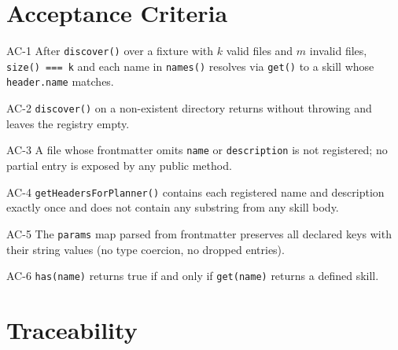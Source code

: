 \section{Acceptance Criteria}

\begin{ac}{AC-1}
After \texttt{discover()} over a fixture with $k$ valid files and $m$ invalid files, \texttt{size() === k} and each name in \texttt{names()} resolves via \texttt{get()} to a skill whose \texttt{header.name} matches.
\end{ac}

\begin{ac}{AC-2}
\texttt{discover()} on a non-existent directory returns without throwing and leaves the registry empty.
\end{ac}

\begin{ac}{AC-3}
A file whose frontmatter omits \texttt{name} or \texttt{description} is not registered; no partial entry is exposed by any public method.
\end{ac}

\begin{ac}{AC-4}
\texttt{getHeadersForPlanner()} contains each registered name and description exactly once and does not contain any substring from any skill body.
\end{ac}

\begin{ac}{AC-5}
The \texttt{params} map parsed from frontmatter preserves all declared keys with their string values (no type coercion, no dropped entries).
\end{ac}

\begin{ac}{AC-6}
\texttt{has(name)} returns true if and only if \texttt{get(name)} returns a defined skill.
\end{ac}

\section{Traceability}

